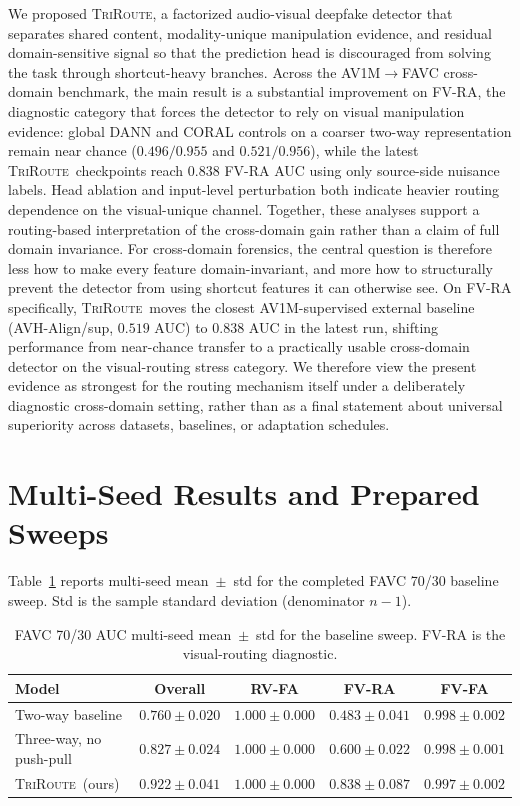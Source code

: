 \documentclass{article}
\newcommand{\method}{\textsc{TriRoute}}
\begin{document}
We proposed \method, a factorized audio-visual deepfake detector that separates shared content, modality-unique manipulation evidence, and residual domain-sensitive signal so that the prediction head is discouraged from solving the task through shortcut-heavy branches. Across the AV1M$\rightarrow$FAVC cross-domain benchmark, the main result is a substantial improvement on FV-RA, the diagnostic category that forces the detector to rely on visual manipulation evidence: global DANN and CORAL controls on a coarser two-way representation remain near chance ($0.496/0.955$ and $0.521/0.956$), while the latest \method\ checkpoints reach $0.838$ FV-RA AUC using only source-side nuisance labels. Head ablation and input-level perturbation both indicate heavier routing dependence on the visual-unique channel. Together, these analyses support a routing-based interpretation of the cross-domain gain rather than a claim of full domain invariance. For cross-domain forensics, the central question is therefore less how to make every feature domain-invariant, and more how to structurally prevent the detector from using shortcut features it can otherwise see.
On FV-RA specifically, \method\ moves the closest AV1M-supervised external baseline (AVH-Align/sup, $0.519$ AUC) to $0.838$ AUC in the latest run, shifting performance from near-chance transfer to a practically usable cross-domain detector on the visual-routing stress category.
We therefore view the present evidence as strongest for the routing mechanism itself under a deliberately diagnostic cross-domain setting, rather than as a final statement about universal superiority across datasets, baselines, or adaptation schedules.




\newpage
\appendix
\section{Multi-Seed Results and Prepared Sweeps}
\label{app:seed_and_sweeps}

Table~\ref{tab:raw_seed_results} reports multi-seed mean~$\pm$~std for the completed FAVC 70/30 baseline sweep. Std is the sample standard deviation (denominator $n-1$).

\begin{table}[h]
    \centering
    \caption{FAVC 70/30 AUC multi-seed mean~$\pm$~std for the baseline sweep. FV-RA is the visual-routing diagnostic.}
    \label{tab:raw_seed_results}
    \small
    \begin{tabular}{lcccc}
        \toprule
        Model & Overall & RV-FA & \textbf{FV-RA} & FV-FA \\
        \midrule
        Two-way baseline & $0.760\pm0.020$ & $1.000\pm0.000$ & $\mathbf{0.483\pm0.041}$ & $0.998\pm0.002$ \\
        Three-way, no push-pull & $0.827\pm0.024$ & $1.000\pm0.000$ & $\mathbf{0.600\pm0.022}$ & $0.998\pm0.001$ \\
        \method\ (ours) & $0.922\pm0.041$ & $1.000\pm0.000$ & $\mathbf{0.838\pm0.087}$ & $0.997\pm0.002$ \\
        \bottomrule
    \end{tabular}
\end{table}
\end{document}
